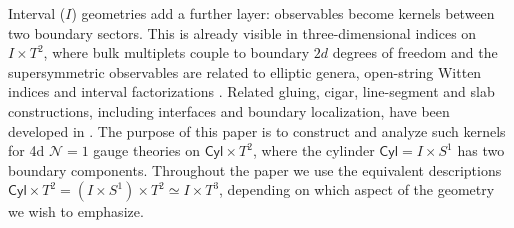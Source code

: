 \documentclass[11pt,a4paper]{article}
\numberwithin{equation}{section}
\theoremstyle{plain}
\theoremstyle{definition}
\theoremstyle{remark}
\newcommand{\cyl}{\mathsf{Cyl}}
\begin{document}
Interval ($I$) geometries add a further layer: observables become kernels between two boundary sectors. %
 This is already visible in three-dimensional indices on \(I\times T^2\), where bulk multiplets couple to boundary \(2d\) degrees of freedom and the supersymmetric observables are related to elliptic genera, open-string Witten indices and interval factorizations \cite{Sugiyama:2020uqh,Yoshida:2014ssa,Zhao:2025ixe}. Related gluing, cigar, line-segment and slab constructions, including interfaces and boundary localization, have been developed in \cite{Dedushenko:2018aox,Dedushenko:2018tgx,Dedushenko:2021mds,Dedushenko:2022uay,Dedushenko:2023qjq,Litvinov:2022pjd}.
The purpose of this paper is to construct and analyze such kernels for 4d  \(\mathcal N=1\)  gauge theories on \(
\cyl\times T^2 \), where the cylinder \(\cyl=I \times S^1\) has two boundary components.  Throughout the paper we use the equivalent descriptions \(
\cyl\times T^2=(I\times S^1)\times T^2\simeq I\times T^3
\), depending on which aspect of the geometry we wish to emphasize. 
\end{document}
